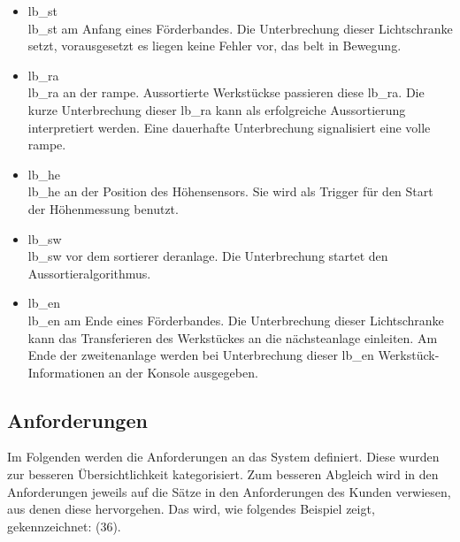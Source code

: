\begin{itemize}
    \begin{itemize}
        \item \gls{lb_st}\\
        \gls{lb_st} am Anfang eines Förderbandes.
        Die Unterbrechung dieser Lichtschranke setzt, vorausgesetzt es liegen keine
        Fehler vor, das \gls{belt} in Bewegung.
        \item \gls{lb_ra}\\
        \gls{lb_ra} an der \gls{rampe}. Aussortierte \Glspl{Werkstück}e passieren diese \gls{lb_ra}.
        Die kurze Unterbrechung dieser \gls{lb_ra} kann als erfolgreiche Aussortierung interpretiert werden.
        Eine dauerhafte Unterbrechung signalisiert eine volle \gls{rampe}.
        \item \gls{lb_he}\\
        \gls{lb_he} an der Position des Höhensensors.
        Sie wird als Trigger für den Start der Höhenmessung benutzt.
        \item \gls{lb_sw}\\
        \gls{lb_sw} vor dem \Gls{sortierer} der\gls{anlage}.
        Die Unterbrechung startet den Aussortieralgorithmus.
        \item \gls{lb_en}\\
        \gls{lb_en} am Ende eines Förderbandes.
        Die Unterbrechung dieser Lichtschranke kann das Transferieren des \Gls{Werkstück}es an die nächste\gls{anlage} einleiten.
        Am Ende der zweiten\gls{anlage} werden bei Unterbrechung dieser \gls{lb_en} \Gls{Werkstück}-Informationen an der Konsole ausgegeben.
    \end{itemize}
\end{itemize}

\subsection{Anforderungen}\label{subsec:anforderungen2}
Im Folgenden werden die Anforderungen an das System definiert. Diese wurden zur besseren
Übersichtlichkeit kategorisiert. Zum besseren Abgleich wird in den
Anforderungen jeweils auf die Sätze in den Anforderungen des Kunden verwiesen, aus denen diese hervorgehen.
Das wird, wie folgendes Beispiel zeigt, gekennzeichnet: (36). 


\FloatBarrier


